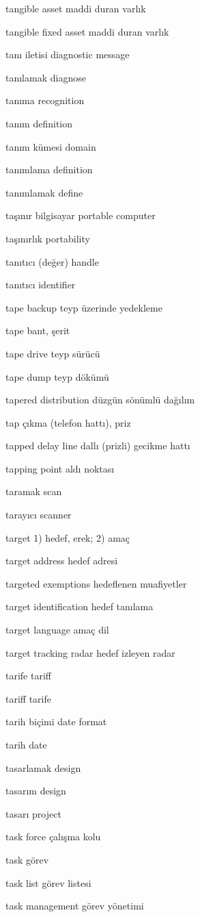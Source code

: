 \documentclass[12pt,fleqn]{article}\usepackage{../../common}
\begin{document}
tangible asset maddi duran varlık

tangible fixed asset maddi duran varlık

tanı iletisi diagnostic message

tanılamak diagnose

tanıma recognition

tanım definition

tanım kümesi domain

tanımlama definition

tanımlamak define

taşınır bilgisayar portable computer

taşınırlık portability

tanıtıcı (değer) handle

tanıtıcı identifier

tape backup teyp üzerinde yedekleme

tape bant, şerit

tape drive teyp sürücü

tape dump teyp dökümü

tapered distribution düzgün sönümlü dağılım

tap çıkma (telefon hattı), priz

tapped delay line dallı (prizli) gecikme hattı

tapping point aldı noktası

taramak scan

tarayıcı scanner

target 1) hedef, erek; 2) amaç

target address hedef adresi

targeted exemptions hedeflenen muafiyetler

target identification hedef tanılama

target language amaç dil

target tracking radar hedef izleyen radar

tarife tariff

tariff tarife

tarih biçimi date format

tarih date

tasarlamak design

tasarım design

tasarı project

task force çalışma kolu

task görev

task list görev listesi

task management görev yönetimi
\end{document}
